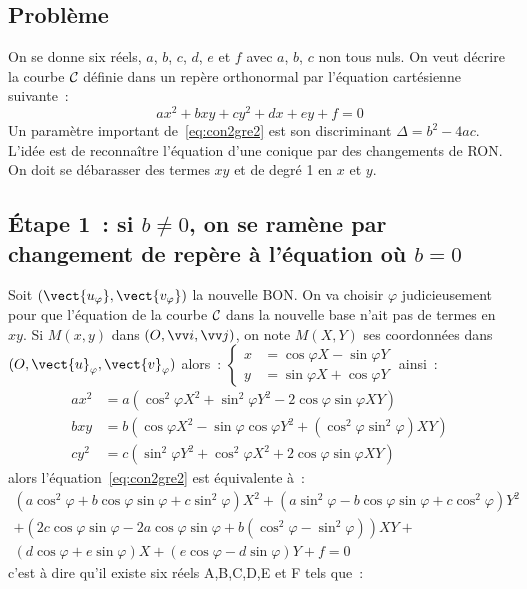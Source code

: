 \subsection{Problème}
On se donne six réels, $a$, $b$, $c$, $d$, $e$ et $f$ avec $a$, $b$, $c$ non tous nuls. On veut décrire la courbe $\mathcal{C}_{}$ définie dans un repère orthonormal par l'équation cartésienne suivante~:
\begin{equation}
  ax^2+bxy+cy^2+dx+ey+f=0 \label{eq:con2gre2}
\end{equation}
Un paramètre important de~\eqref{eq:con2gre2} est son discriminant $\Delta=b^2-4ac$. L'idée est de reconnaître l'équation d'une conique par des changements de RON\@. On doit se débarasser des termes $xy$ et de degré 1 en $x$ et $y$.

\subsection{Étape 1~: si $b\neq 0$, on se ramène par changement de repère à l'équation où $b=0$}
Soit $(\vect{u_{\varphi}},\vect{v_{\varphi}})$ la nouvelle BON\@. On va choisir $\varphi$ judicieusement pour que l'équation de la courbe $\mathcal{C}_{}$ dans la nouvelle base n'ait pas de termes en $xy$. Si $M(x,y)$ dans $\rond$, on note $M(X,Y)$ ses coordonnées dans $(O,\vect{u}_\varphi,\vect{v}_\varphi)$ alors~:
$\begin{cases} x&=\cos\varphi X - \sin\varphi Y \\ y&=\sin\varphi X + \cos\varphi Y\end{cases}$ ainsi~:
\begin{align}
  ax^2&=a(\cos^2\varphi X^2 + \sin^2\varphi Y^2 - 2\cos\varphi\sin\varphi XY)\\
  bxy&=b(\cos\varphi X^2 -\sin\varphi\cos\varphi Y^2 + (\cos^2\varphi \sin^2\varphi)XY)\\
  cy^2&=c(\sin^2\varphi Y^2 + \cos^2\varphi X^2 + 2\cos\varphi\sin\varphi XY)
\end{align}
alors l'équation~\eqref{eq:con2gre2} est équivalente à~:
\begin{multline}
 (a\cos^2\varphi + b\cos\varphi\sin\varphi +c\sin^2\varphi)X^2+(a\sin^2\varphi - b\cos\varphi\sin\varphi +c\cos^2\varphi)Y^2\\+(2c\cos\varphi\sin\varphi-2a\cos\varphi\sin\varphi+b(\cos^2\varphi - \sin^2\varphi))XY + \\ (d\cos\varphi + e\sin\varphi)X +(e\cos\varphi - d\sin\varphi)Y +f=0
\end{multline}
c'est à dire qu'il existe six réels A,B,C,D,E et F tels que~:
